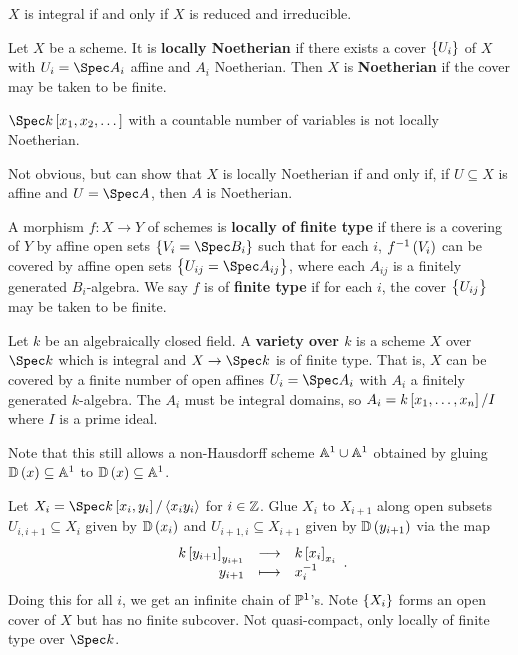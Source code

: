 \begin{theorem}
$ X $ is integral if and only if $ X $ is reduced and irreducible.
\end{theorem}

\begin{definition*}
Let $ X $ be a scheme. It is \textbf{locally Noetherian} if there exists a cover $ \cbr{U_i} $ of $ X $ with $ U_i = \Spec A_i $ affine and $ A_i $ Noetherian. Then $ X $ is \textbf{Noetherian} if the cover may be taken to be finite.
\end{definition*}

\begin{example*}
$ \Spec k\sbr{x_1, x_2, \dots} $ with a countable number of variables is not locally Noetherian.
\end{example*}

Not obvious, but can show that $ X $ is locally Noetherian if and only if, if $ U \subseteq X $ is affine and $ U = \Spec A $, then $ A $ is Noetherian.

\begin{definition*}
A morphism $ f : X \to Y $ of schemes is \textbf{locally of finite type} if there is a covering of $ Y $ by affine open sets $ \cbr{V_i = \Spec B_i} $ such that for each $ i $, $ f^{-1}\br{V_i} $ can be covered by affine open sets $ \cbr{U_{ij} = \Spec A_{ij}} $, where each $ A_{ij} $ is a finitely generated $ B_i $-algebra. We say $ f $ is of \textbf{finite type} if for each $ i $, the cover $ \cbr{U_{ij}} $ may be taken to be finite.
\end{definition*}

\begin{definition*}
Let $ k $ be an algebraically closed field. A \textbf{variety over $ k $} is a scheme $ X $ over $ \Spec k $ which is integral and $ X \to \Spec k $ is of finite type. That is, $ X $ can be covered by a finite number of open affines $ U_i = \Spec A_i $ with $ A_i $ a finitely generated $ k $-algebra. The $ A_i $ must be integral domains, so $ A_i = k\sbr{x_1, \dots, x_n} / I $ where $ I $ is a prime ideal.
\end{definition*}

Note that this still allows a non-Hausdorff scheme $ \AA^1 \cup \AA^1 $ obtained by gluing $ \DD\br{x} \subseteq \AA^1 $ to $ \DD\br{x} \subseteq \AA^1 $.

\begin{example*}
Let $ X_i = \Spec k\sbr{x_i, y_i} / \abr{x_iy_i} $ for $ i \in \ZZ $. Glue $ X_i $ to $ X_{i + 1} $ along open subsets $ U_{i, i + 1} \subseteq X_i $ given by $ \DD\br{x_i} $ and $ U_{i + 1, i} \subseteq X_{i + 1} $ given by $ \DD\br{y_{i + 1}} $ via the map
$$ \function{k\sbr{y_{i + 1}}_{y_{i + 1}}}{k\sbr{x_i}_{x_i}}{y_{i + 1}}{x_i^{-1}}. $$
Doing this for all $ i $, we get an infinite chain of $ \PP^1 $'s. Note $ \cbr{X_i} $ forms an open cover of $ X $ but has no finite subcover. Not quasi-compact, only locally of finite type over $ \Spec k $.
\end{example*}

